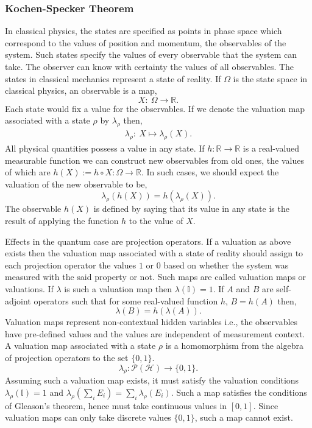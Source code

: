 \documentclass[11pt]{report}
\begin{document}
\subsubsection{{Kochen-Specker Theorem}}
In classical physics, the states are specified as points in phase space which correspond to the values of position and momentum, the observables of the system. Such states specify the values of every observable that the system can take. The observer can know with certainty the values of all observables. The states in classical mechanics represent a state of reality. If $\Omega$ is the state space in classical physics, an observable is a map,
$$X:\:\Omega\to \mathbb{R}.$$
Each state would fix a value for the observables. If we denote the valuation map associated with a state $\rho$ by $\lambda_\rho$ then,
\begin{align*}
	\lambda_\rho:\: X\mapsto \lambda_\rho(X).
\end{align*}
All physical quantities possess a value in any state. If $h:\mathbb{R}\to\mathbb{R}$ is a real-valued measurable function we can construct new observables from old ones, the values of which are $h(X):=h\circ X:\Omega\to\mathbb{R}$. In such cases, we should expect the valuation of the new observable to be,
$$\lambda_\rho(h(X))=h(\lambda_\rho(X)).$$
The observable $h(X)$ is defined by saying that its value in any state is the result of applying the function $h$ to the value of $X$.

Effects in the quantum case are projection operators. If a valuation as above exists then the valuation map associated with a state of reality should assign to each projection operator the values $1$ or $0$ based on whether the system was measured with the said property or not. Such maps are called valuation maps or valuations. If $\lambda$ is such a valuation map then $\lambda(\mathbb{I})=1$. If $A$ and $B$ are self-adjoint operators such that for some real-valued function $h$, $B=h(A)$ then, 
$$\lambda(B)=h(\lambda(A)).$$
Valuation maps represent non-contextual hidden variables i.e., the observables have pre-defined values and the values are independent of measurement context. A valuation map associated with a state $\rho$ is a homomorphism from the algebra of projection operators to the set $\{0,1\}$.
$$\lambda_\rho:\mathcal{P}(\mathcal{H})\to \{0,1\}.$$
Assuming such a valuation map exists, it must satisfy the valuation conditions $\lambda_\rho(\mathbb{I})=1$ and $\lambda_\rho(\sum_i E_i)=\sum_i \lambda_\rho(E_i).$
Such a map satisfies the conditions of Gleason's theorem, hence must take continuous values in $[0,1]$. Since valuation maps can only take discrete values $\{0,1\}$, such a map cannot exist.
\end{document}

